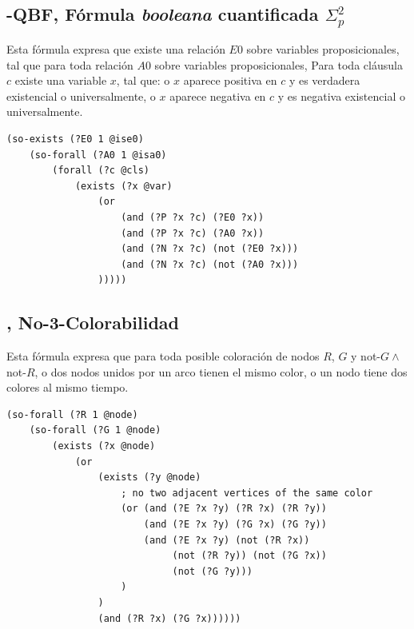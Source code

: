 \subsection{\qEA-QBF, Fórmula \textit{booleana} cuantificada $\Sigma_p^2$}
Esta fórmula expresa que existe una relación $E0$ sobre variables
proposicionales, tal que para toda relación $A0$ sobre variables
proposicionales, Para toda cláusula $c$ existe una variable $x$, tal que: o $x$ aparece
positiva en $c$ y es verdadera existencial o universalmente, o $x$ aparece negativa en $c$ y
es negativa existencial o universalmente.
\begin{verbatim}
(so-exists (?E0 1 @ise0)
    (so-forall (?A0 1 @isa0)
        (forall (?c @cls)
            (exists (?x @var)
                (or
                    (and (?P ?x ?c) (?E0 ?x))
                    (and (?P ?x ?c) (?A0 ?x))
                    (and (?N ?x ?c) (not (?E0 ?x)))
                    (and (?N ?x ?c) (not (?A0 ?x)))
                )))))
\end{verbatim}

\subsection{\coCOL, No-3-Colorabilidad}
Esta fórmula expresa que para toda posible coloración de nodos $R$, $G$ y not-$G \land $ not-$R$, o dos nodos unidos por un arco tienen
el mismo color, o un nodo tiene dos colores al mismo tiempo.
\begin{verbatim}
(so-forall (?R 1 @node)
    (so-forall (?G 1 @node)
        (exists (?x @node)
            (or 
                (exists (?y @node)
                    ; no two adjacent vertices of the same color
                    (or (and (?E ?x ?y) (?R ?x) (?R ?y))
                        (and (?E ?x ?y) (?G ?x) (?G ?y))
                        (and (?E ?x ?y) (not (?R ?x)) 
                             (not (?R ?y)) (not (?G ?x)) 
                             (not (?G ?y)))
                    )
                )
                (and (?R ?x) (?G ?x))))))
\end{verbatim}

